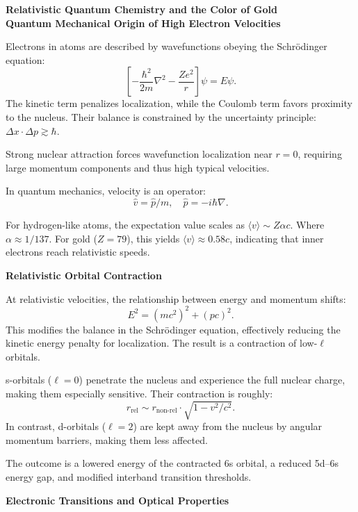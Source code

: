 \begin{technical}
    \sloppy
    {\Large\textbf{Relativistic Quantum Chemistry and the Color of Gold}}\\[0.7em]
    
    \noindent\textbf{Quantum Mechanical Origin of High Electron Velocities}
    
    Electrons in atoms are described by wavefunctions obeying the Schrödinger equation:
    \[
    \left[ -\frac{\hbar^2}{2m} \nabla^2 - \frac{Ze^2}{r} \right] \psi = E \psi.
    \]
    The kinetic term penalizes localization, while the Coulomb term favors proximity to the nucleus. Their balance is constrained by the uncertainty principle: $\Delta x \cdot \Delta p \gtrsim \hbar$.
    
    Strong nuclear attraction forces wavefunction localization near $r = 0$, requiring large momentum components and thus high typical velocities.
    
    In quantum mechanics, velocity is an operator:
    \[
    \hat{v} = \hat{p}/m, \quad \hat{p} = -i\hbar \nabla.
    \]

    For hydrogen-like atoms, the expectation value scales as $\langle v \rangle \sim Z\alpha c$. Where $ \alpha \approx 1/137 $. For gold (\(Z = 79\)), this yields \(\langle v \rangle \approx 0.58c\), indicating that inner electrons reach relativistic speeds.
    
    \noindent\textbf{Relativistic Orbital Contraction}
    
    At relativistic velocities, the relationship between energy and momentum shifts:
    \[
    E^2 = (m c^2)^2 + (pc)^2.
    \]
    This modifies the balance in the Schrödinger equation, effectively reducing the kinetic energy penalty for localization. The result is a contraction of low-$\ell$ orbitals.
    
    s-orbitals (\(\ell = 0\)) penetrate the nucleus and experience the full nuclear charge, making them especially sensitive. Their contraction is roughly:
    \[
    r_\text{rel} \sim r_\text{non-rel} \cdot \sqrt{1 - v^2/c^2}.
    \]
    In contrast, d-orbitals (\(\ell = 2\)) are kept away from the nucleus by angular momentum barriers, making them less affected.
    
    The outcome is a lowered energy of the contracted 6s orbital, a reduced 5d–6s energy gap, and modified interband transition thresholds.
    
    \noindent\textbf{Electronic Transitions and Optical Properties}
    

\end{technical}
